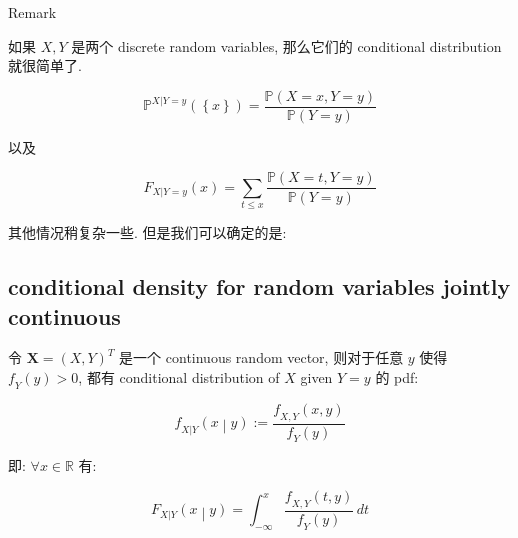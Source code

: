 \begin{qlremark}{Remark}

如果 \(\mathit{X},\mathit{Y}\) 是两个 discrete random variables, 那么它们的 conditional distribution 就很简单了.

\[\mathbb{P}^{\mathit{X}|\mathit{Y} = \mathit{y}}(\left\{ \mathit{x} \right\}) = \frac{\mathbb{P}(\mathit{X} = \mathit{x},\mathit{Y} = \mathit{y})}{\mathbb{P}(\mathit{Y} = \mathit{y})}\]

以及

\[\mathit{F}_{\mathit{X}|\mathit{Y} = \mathit{y}}(\mathit{x}) = \sum\limits_{\mathit{t} \leq \mathit{x}}\frac{\mathbb{P}(\mathit{X} = \mathit{t},\mathit{Y} = \mathit{y})}{\mathbb{P}(\mathit{Y} = \mathit{y})}\]

其他情况稍复杂一些. 但是我们可以确定的是:

\end{qlremark}

\subsection{conditional density for random variables jointly continuous}\label{conditional-density-for-random-variables-jointly-continuous}

\begin{theorem}{}\label{thm-03-joint-conditional-distribution-jointly-continuous-rvs-defined-conditional-density}

令 \(\mathbf{X} = (\mathit{X},\mathit{Y})^{\mathit{T}}\) 是一个 continuous random vector, 则对于任意 \(\mathit{y}\) 使得 \(\mathit{f}_{\mathit{Y}}(\mathit{y}) > 0\), 都有 conditional distribution of \(\mathit{X}\) given \(\mathit{Y} = \mathit{y}\) 的 pdf:

\[\left. \mathit{f}_{\mathit{X}|\mathit{Y}}(\mathit{x} \middle| \mathit{y}) := \frac{\mathit{f}_{\mathit{X},\mathit{Y}}(\mathit{x},\mathit{y})}{\mathit{f}_{\mathit{Y}}(\mathit{y})} \right.\]

即: \(\forall\mathit{x} \in \mathbb{R}\) 有:

\[\left. \mathit{F}_{\mathit{X}|\mathit{Y}}(\mathit{x} \middle| \mathit{y}) = \int_{- \infty}^{\mathit{x}}\frac{\mathit{f}_{\mathit{X},\mathit{Y}}(\mathit{t},\mathit{y})}{\mathit{f}_{\mathit{Y}}(\mathit{y})}\,\mathit{d}\mathit{t} \right.\]

\end{theorem}

